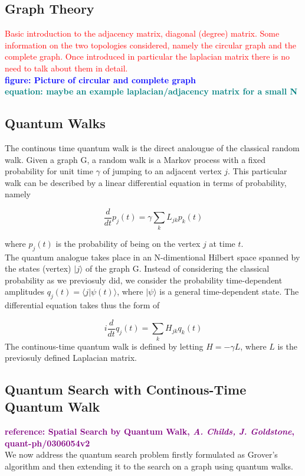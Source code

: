 \documentclass[aps,pra,reprint, onecolumn, showkeys]{revtex4-2}
\newcommand{\red}[1]{\textcolor{red}{#1}}
\newcommand{\blue}[1]{\textcolor{blue}{\textbf{figure: #1}}}
\newcommand{\teal}[1]{\textcolor{teal}{\textbf{equation: #1}}}
\newcommand{\purple}[1]{\textcolor{purple}{\textbf{reference: #1}}}
\begin{document}
\subsection{Graph Theory}
\red{Basic introduction to the adjacency matrix, diagonal (degree) matrix. Some information on the two topologies considered, namely the circular graph and the complete graph. Once introduced in particular the laplacian matrix there is no need to talk about them in detail.}\\
\blue{Picture of circular and complete graph}\\
\teal{maybe an example laplacian/adjacency matrix for a small N}


\subsection{Quantum Walks}
The continous time quantum walk is the direct analougue of the classical random walk. Given a graph G, a random walk is a Markov process with a fixed probability for unit time $\gamma$ of jumping to an adjacent vertex $j$. This particular walk can be described by a linear differential equation in terms of probability, namely

\begin{equation}
  \frac{d}{dt}p_j(t) = \gamma\sum_{k}L_{jk}p_k(t)
\end{equation}

where $p_j(t)$ is the probability of being on the vertex $j$ at time $t$.\\
The quantum analogue takes place in an N-dimentional Hilbert space spanned by the states (vertex) $|j\rangle$ of the graph G. Instead of considering the classical probability as we previosuly did, we consider the probability time-dependent amplitudes $q_j(t) = \langle j|\psi(t)\rangle$, where $|\psi\rangle$ is a general time-dependent state. The differential equation takes thus the form of

\begin{equation}
  i\frac{d}{dt}q_j(t) = \sum_{k}H_{jk}q_k(t)
\end{equation}
The continous-time quantum walk is defined by letting $H=-\gamma L$, where $L$ is the previosuly defined Laplacian matrix.


\subsection{Quantum Search with Continous-Time Quantum Walk}
\purple{Spatial Search by Quantum Walk, \textit{A. Childs, J. Goldstone}, quant-ph/0306054v2}\\
We now address the quantum search problem firstly formulated as Grover's algorithm and then extending it to the search on a graph using quantum walks. \\
\end{document}

